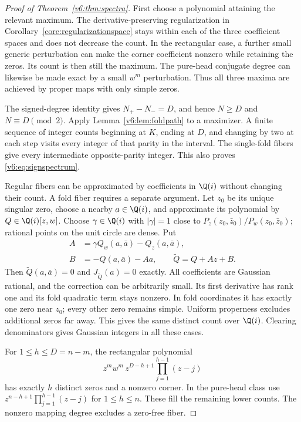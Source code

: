 \documentclass[UTF8,11pt]{ctexart}
\theoremstyle{definition}
\numberwithin{equation}{section}
\begin{document}
\begin{proof}[Proof of Theorem~\ref{v6:thm:spectra}]
First choose a polynomial attaining the relevant maximum.
The derivative-preserving regularization in
Corollary~\ref{core:regularizationspace} stays within each of the
three coefficient spaces and does not decrease the count. In the
rectangular case, a further small generic perturbation can make the
corner coefficient nonzero while retaining the zeros. Its count is
then still the maximum. The pure-head conjugate degree can likewise
be made exact by a small $w^m$ perturbation. Thus all three maxima
are achieved by proper maps with only simple zeros.

The signed-degree identity gives $N_+-N_-=D$, and hence
$N\ge D$ and $N\equiv D\pmod2$. Apply
Lemma~\ref{v6:lem:foldpath} to a maximizer. A finite sequence of
integer counts beginning at $K$, ending at $D$, and changing by
two at each step visits every integer of that parity in the interval.
The single-fold fibers give every intermediate opposite-parity
integer. This also proves \eqref{v6:eq:signspectrum}.

Regular fibers can be approximated by coefficients in $\Q(i)$
without changing their count. A fold fiber requires a separate
argument. Let $z_0$ be its unique singular zero, choose a nearby
$a\in\Q(i)$, and approximate its polynomial by $Q\in\Q(i)[z,w]$.
Choose $\gamma\in\Q(i)$ with $|\gamma|=1$ close to
$P_z(z_0,\bar z_0)/P_w(z_0,\bar z_0)$; rational points on the
unit circle are dense. Put
\begin{equation}\label{v6:eq:rationalfold}
 \begin{split}
 A&=\gamma Q_w(a,\bar a)-Q_z(a,\bar a),\\
 B&=-Q(a,\bar a)-Aa,\qquad \widetilde Q=Q+Az+B.
 \end{split}
\end{equation}
Then $\widetilde Q(a,\bar a)=0$ and $J_{\widetilde Q}(a)=0$
exactly. All coefficients are Gaussian rational, and the correction
can be arbitrarily small. Its first derivative has rank one and its
fold quadratic term stays nonzero. In fold coordinates it has
exactly one zero near $z_0$; every other zero remains simple.
Uniform properness excludes additional zeros far away. This gives
the same distinct count over $\Q(i)$. Clearing denominators gives
Gaussian integers in all these cases.

For $1\le h\le D=n-m$, the rectangular polynomial
\[
 z^mw^m\,z^{D-h+1}\prod_{j=1}^{h-1}(z-j)
\]
has exactly $h$ distinct zeros and a nonzero corner. In the
pure-head class use $z^{n-h+1}\prod_{j=1}^{h-1}(z-j)$ for
$1\le h\le n$. These fill the remaining lower counts.
The nonzero mapping degree excludes a zero-free fiber.


\end{proof}
\end{document}
